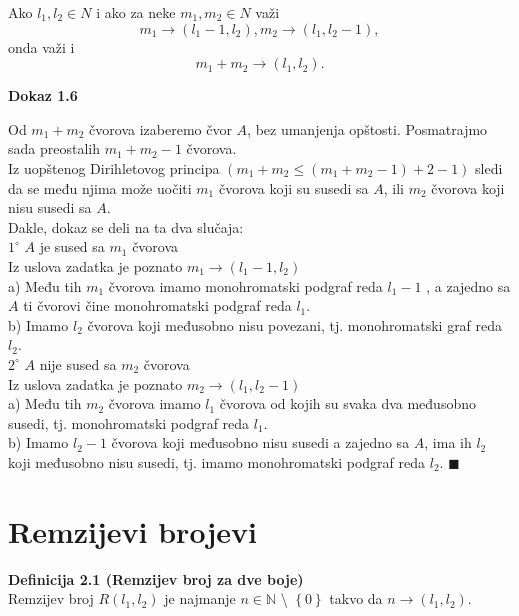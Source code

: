 \documentclass[12pt,a4paper]{article}
\begin{document}
	\noindent	Ako $l_{1}, l_{2} \in N$ i ako za neke $m_{1}, m_{2} \in N$ važi	
	\[m_{1} \rightarrow (l_{1}-1, l_{2}), m_{2} \rightarrow (l_{1}, l_{2}-1) ,\]
	onda važi i
	\[m_{1} + m_{2} \rightarrow (l_{1}, l_{2}).\]
	\vspace{1.5em}

	{\noindent\fontsize{12pt}{12pt}\textbf{Dokaz 1.6}}
	\vspace{0.5em}

	\noindent	Od $m_{1}+m_{2}$ čvorova izaberemo čvor $A$, bez umanjenja opštosti. Posmatrajmo sada preostalih $m_1+m_2-1$ čvorova.\\ Iz uopštenog Dirihletovog principa $(m_{1}+m_{2} \leq (m_{1}+m_{2}-1)+2-1)$ sledi da se
	među njima može uočiti $m_1$ čvorova koji su susedi sa $A$, ili $m_2$ čvorova koji nisu susedi sa $A$.\\
	

	\vspace{-0.4em}
	\noindent Dakle, dokaz se deli na ta dva slučaja:\\


	\noindent $1^\circ $ $A$ je sused sa $m_{1}$ čvorova\\
	
	Iz uslova zadatka je poznato $m_{1} \rightarrow (l_{1}-1, l_{2})$\\
	\indent a) Među tih $m_1$ čvorova imamo monohromatski podgraf reda $l_{1}-1$ , a zajedno sa $A$ ti čvorovi čine monohromatski podgraf reda  $l_{1}$. \\
	\indent b) Imamo $l_{2}$ čvorova koji međusobno nisu povezani, tj. monohromatski graf reda $l_{2}$.\\

	\vspace{0.5em}
	\noindent $2^\circ$ $A$ nije sused  sa  $m_{2}$ čvorova\\
	
	Iz uslova zadatka je poznato $m_{2} \rightarrow (l_{1}, l_{2}-1)$\\
	\indent a) Među tih $m_{2}$ čvorova imamo $l_{1}$ čvorova od kojih su svaka dva međusobno susedi, tj. monohromatski podgraf reda $l_{1}$.\\
	\indent b) Imamo $l_{2}-1$ čvorova koji međusobno nisu susedi a zajedno sa $A$, ima ih $l_{2}$ koji međusobno nisu susedi, tj. imamo monohromatski podgraf reda $l_{2}$. \hspace{0.5em}$\blacksquare$\\
	
	
	
	
	\section{Remzijevi brojevi}
	\vspace{1em}
	\begin{mdframed}
	{\fontsize{12pt}{12pt}\textbf{Definicija 2.1 (Remzijev broj za dve boje)}}
	\vspace{0.5em}	
	\\
	Remzijev broj $R(l_{1}, l_{2})$ je najmanje $n \in \mathbb{N}$ \textbackslash {} $\left\lbrace 0\right\rbrace $ takvo da $n\rightarrow(l_{1}, l_{2})$.
	\end{mdframed}
	
\end{document}
